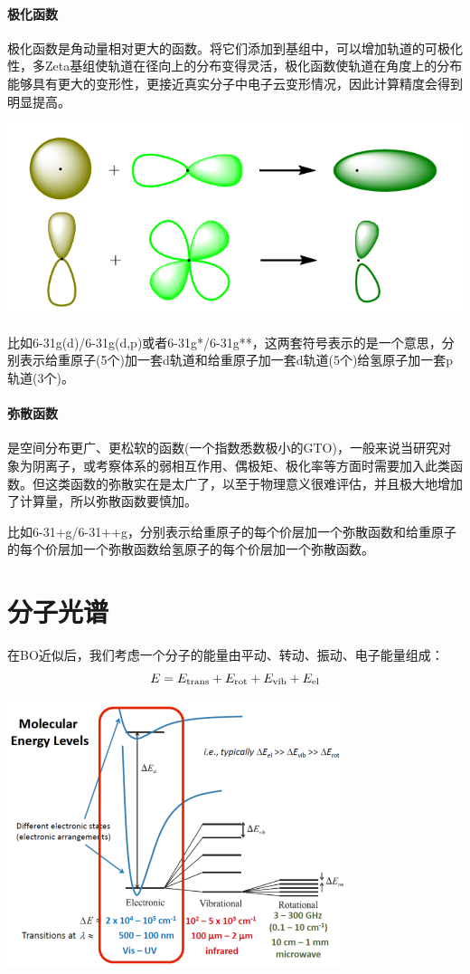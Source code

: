 \paragraph*{极化函数}
极化函数是角动量相对更大的函数。将它们添加到基组中，可以增加轨道的可极化性，多Zeta基组使轨道在径向上的分布变得灵活，极化函数使轨道在角度上的分布能够具有更大的变形性，更接近真实分子中电子云变形情况，因此计算精度会得到明显提高。
\begin{center}
    \includegraphics[scale=0.4]{fig/lzhx/polarization.png}
\end{center}
比如6-31g(d)/6-31g(d,p)或者6-31g*/6-31g**，这两套符号表示的是一个意思，分别表示给重原子(5个)加一套d轨道和给重原子加一套d轨道(5个)给氢原子加一套p轨道(3个)。
\paragraph*{弥散函数}
是空间分布更广、更松软的函数(一个指数悉数极小的GTO)，一般来说当研究对象为阴离子，或考察体系的弱相互作用、偶极矩、极化率等方面时需要加入此类函数。但这类函数的弥散实在是太广了，以至于物理意义很难评估，并且极大地增加了计算量，所以弥散函数要慎加。

比如6-31+g/6-31++g，分别表示给重原子的每个价层加一个弥散函数和给重原子的每个价层加一个弥散函数给氢原子的每个价层加一个弥散函数。



\section{分子光谱}
在BO近似后，我们考虑一个分子的能量由平动、转动、振动、电子能量组成：
\[E=E_{\rm{trans}}+E_{\rm{rot}}+E_{\rm{vib}}+E_{\rm{el}}\]
\begin{center}
    \includegraphics{fig/lzhx/微信图片_20211102175446.png}
\end{center}

